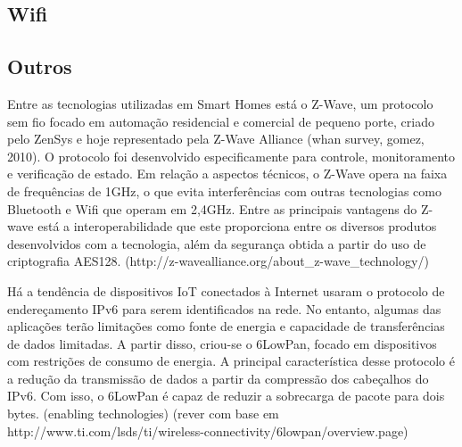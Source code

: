 





\subsection{Wifi}


\subsection{Outros}
Entre as tecnologias utilizadas em Smart Homes está o Z-Wave, um protocolo sem fio focado em automação residencial e comercial de pequeno porte, criado pelo ZenSys e hoje representado pela Z-Wave Alliance  (whan survey, gomez, 2010). O protocolo foi desenvolvido especificamente para controle, monitoramento e verificação de estado. Em relação a aspectos técnicos, o Z-Wave opera na faixa de frequências de 1GHz, o que evita interferências com outras tecnologias como Bluetooth e Wifi que operam em 2,4GHz. Entre as principais vantagens do Z-wave está a interoperabilidade que este proporciona entre os diversos produtos desenvolvidos com a tecnologia, além da segurança obtida a partir do uso de criptografia AES128.  (http://z-wavealliance.org/about_z-wave_technology/)

Há a tendência de dispositivos IoT conectados à Internet usaram o protocolo de endereçamento IPv6 para serem identificados na rede. No entanto, algumas das aplicações terão limitações como fonte de energia e capacidade de transferências de dados limitadas. A partir disso, criou-se o 6LowPan, focado em dispositivos com restrições de consumo de energia. A principal característica desse protocolo é a redução da transmissão de dados a partir da compressão dos cabeçalhos do IPv6. Com isso, o 6LowPan é capaz de reduzir a sobrecarga de pacote para dois bytes. (enabling technologies)
(rever com base em http://www.ti.com/lsds/ti/wireless-connectivity/6lowpan/overview.page)

